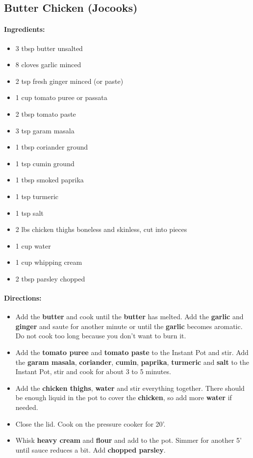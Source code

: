 \documentclass{article}
\begin{document}
\subsection{Butter Chicken (Jocooks)}

\paragraph{Ingredients:}
\begin{itemize}
    \item 3 tbsp butter unsalted
    \item 8 cloves garlic minced
    \item 2 tsp fresh ginger minced (or paste)
    \item 1 cup tomato puree or passata
    \item 2 tbsp tomato paste
    \item 3 tsp garam masala
    \item 1 tbsp coriander ground
    \item 1 tsp cumin ground
    \item 1 tbsp smoked paprika
    \item 1 tsp turmeric
    \item 1 tsp salt
    \item 2 lbs chicken thighs boneless and skinless, cut into pieces
    \item 1 cup water
    \item 1 cup whipping cream
    \item 2 tbsp parsley chopped
\end{itemize}

\paragraph{Directions:}
\begin{itemize}
    \item Add the \textbf{butter} and cook until the \textbf{butter} has melted. Add the \textbf{garlic} and \textbf{ginger} and saute for another minute or until the \textbf{garlic} becomes aromatic. Do not cook too long because you don’t want to burn it.
    \item Add the \textbf{tomato puree} and \textbf{tomato paste} to the Instant Pot and stir. Add the \textbf{garam masala}, \textbf{coriander}, \textbf{cumin}, \textbf{paprika}, \textbf{turmeric} and \textbf{salt} to the Instant Pot, stir and cook for about 3 to 5 minutes.
    \item Add the \textbf{chicken thighs}, \textbf{water} and stir everything together. There should be enough liquid in the pot to cover the \textbf{chicken}, so add more \textbf{water} if needed.
    \item Close the lid. Cook on the pressure cooker for 20’.
    \item Whisk \textbf{heavy cream} and \textbf{flour} and add to the pot. Simmer for another 5’ until sauce reduces a bit. Add \textbf{chopped parsley}.
\end{itemize}
\end{document}
